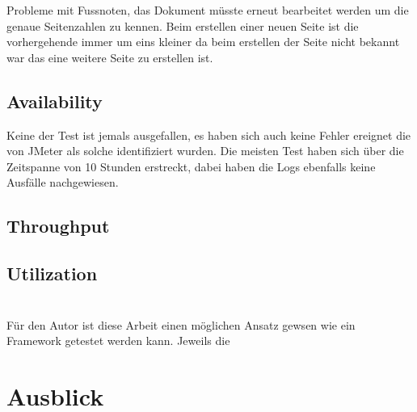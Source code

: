 \documentclass[main.tex]{subfiles}
\begin{document}
Probleme mit Fussnoten, das Dokument müsste erneut bearbeitet werden um die genaue Seitenzahlen zu kennen. Beim erstellen einer neuen Seite ist die vorhergehende immer um eins kleiner da beim erstellen der Seite nicht bekannt war das eine weitere Seite zu erstellen ist.



\subsection{Availability}

Keine der Test ist jemals ausgefallen, es haben sich auch keine Fehler ereignet die von JMeter als solche identifiziert wurden.
Die meisten Test haben sich über die Zeitspanne von 10 Stunden erstreckt, dabei haben  die Logs ebenfalls keine Ausfälle nachgewiesen. 


\subsection{}


\subsection{Throughput}


\subsection{Utilization}


\section{}

Für den Autor ist diese Arbeit einen möglichen Ansatz gewsen wie ein Framework getestet werden kann. Jeweils die 

\section{Ausblick}
\end{document}

